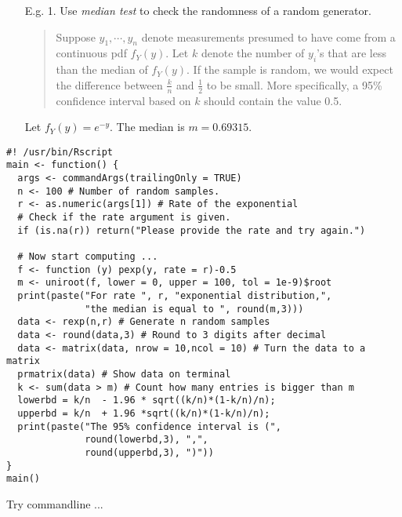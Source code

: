 \begin{frame}

 \begin{enumerate}
  \item[E.g. 1.] Use {\it median test} to check the randomness of a random generator. \\[1em]
  \begin{quote}
   Suppose $y_1 , \cdots, y_n$ denote measurements presumed to have come from a
continuous pdf $f_Y(y)$. Let $k$ denote the number of $y_i$'s that are less than the median
of $f_Y (y)$. If the sample is random, we would expect the difference between $\frac{k}{n}$ and $\frac{1}{2}$
to be small. More specifically, a 95\% confidence interval based on $k$ should contain the value 0.5.
  \end{quote}
  \vfill
  \pause
  Let $f_Y(y)=e^{-y}$. The median is $m=0.69315$.
 \end{enumerate}

\end{frame}
\begin{frame}[fragile]
 \begin{lstlisting}
#! /usr/bin/Rscript
main <- function() {
  args <- commandArgs(trailingOnly = TRUE)
  n <- 100 # Number of random samples.
  r <- as.numeric(args[1]) # Rate of the exponential
  # Check if the rate argument is given.
  if (is.na(r)) return("Please provide the rate and try again.")

  # Now start computing ...
  f <- function (y) pexp(y, rate = r)-0.5
  m <- uniroot(f, lower = 0, upper = 100, tol = 1e-9)$root
  print(paste("For rate ", r, "exponential distribution,",
              "the median is equal to ", round(m,3)))
  data <- rexp(n,r) # Generate n random samples
  data <- round(data,3) # Round to 3 digits after decimal
  data <- matrix(data, nrow = 10,ncol = 10) # Turn the data to a matrix
  prmatrix(data) # Show data on terminal
  k <- sum(data > m) # Count how many entries is bigger than m
  lowerbd = k/n  - 1.96 * sqrt((k/n)*(1-k/n)/n);
  upperbd = k/n  + 1.96 *sqrt((k/n)*(1-k/n)/n);
  print(paste("The 95% confidence interval is (",
              round(lowerbd,3), ",",
              round(upperbd,3), ")"))
}
main()
\end{lstlisting}
Try commandline ...
\end{frame}
